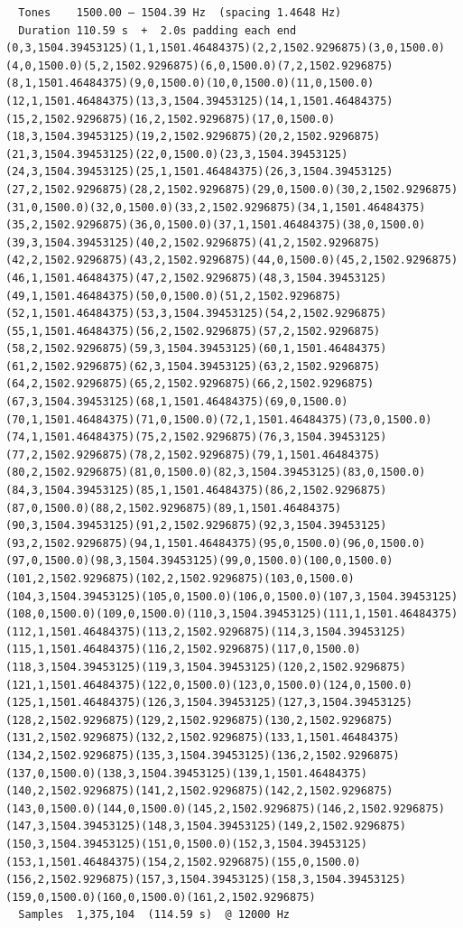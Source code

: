 \begin{lstlisting}
  Tones    1500.00 – 1504.39 Hz  (spacing 1.4648 Hz)
  Duration 110.59 s  +  2.0s padding each end
(0,3,1504.39453125)(1,1,1501.46484375)(2,2,1502.9296875)(3,0,1500.0)(4,0,1500.0)(5,2,1502.9296875)(6,0,1500.0)(7,2,1502.9296875)(8,1,1501.46484375)(9,0,1500.0)(10,0,1500.0)(11,0,1500.0)(12,1,1501.46484375)(13,3,1504.39453125)(14,1,1501.46484375)(15,2,1502.9296875)(16,2,1502.9296875)(17,0,1500.0)(18,3,1504.39453125)(19,2,1502.9296875)(20,2,1502.9296875)(21,3,1504.39453125)(22,0,1500.0)(23,3,1504.39453125)(24,3,1504.39453125)(25,1,1501.46484375)(26,3,1504.39453125)(27,2,1502.9296875)(28,2,1502.9296875)(29,0,1500.0)(30,2,1502.9296875)(31,0,1500.0)(32,0,1500.0)(33,2,1502.9296875)(34,1,1501.46484375)(35,2,1502.9296875)(36,0,1500.0)(37,1,1501.46484375)(38,0,1500.0)(39,3,1504.39453125)(40,2,1502.9296875)(41,2,1502.9296875)(42,2,1502.9296875)(43,2,1502.9296875)(44,0,1500.0)(45,2,1502.9296875)(46,1,1501.46484375)(47,2,1502.9296875)(48,3,1504.39453125)(49,1,1501.46484375)(50,0,1500.0)(51,2,1502.9296875)(52,1,1501.46484375)(53,3,1504.39453125)(54,2,1502.9296875)(55,1,1501.46484375)(56,2,1502.9296875)(57,2,1502.9296875)(58,2,1502.9296875)(59,3,1504.39453125)(60,1,1501.46484375)(61,2,1502.9296875)(62,3,1504.39453125)(63,2,1502.9296875)(64,2,1502.9296875)(65,2,1502.9296875)(66,2,1502.9296875)(67,3,1504.39453125)(68,1,1501.46484375)(69,0,1500.0)(70,1,1501.46484375)(71,0,1500.0)(72,1,1501.46484375)(73,0,1500.0)(74,1,1501.46484375)(75,2,1502.9296875)(76,3,1504.39453125)(77,2,1502.9296875)(78,2,1502.9296875)(79,1,1501.46484375)(80,2,1502.9296875)(81,0,1500.0)(82,3,1504.39453125)(83,0,1500.0)(84,3,1504.39453125)(85,1,1501.46484375)(86,2,1502.9296875)(87,0,1500.0)(88,2,1502.9296875)(89,1,1501.46484375)(90,3,1504.39453125)(91,2,1502.9296875)(92,3,1504.39453125)(93,2,1502.9296875)(94,1,1501.46484375)(95,0,1500.0)(96,0,1500.0)(97,0,1500.0)(98,3,1504.39453125)(99,0,1500.0)(100,0,1500.0)(101,2,1502.9296875)(102,2,1502.9296875)(103,0,1500.0)(104,3,1504.39453125)(105,0,1500.0)(106,0,1500.0)(107,3,1504.39453125)(108,0,1500.0)(109,0,1500.0)(110,3,1504.39453125)(111,1,1501.46484375)(112,1,1501.46484375)(113,2,1502.9296875)(114,3,1504.39453125)(115,1,1501.46484375)(116,2,1502.9296875)(117,0,1500.0)(118,3,1504.39453125)(119,3,1504.39453125)(120,2,1502.9296875)(121,1,1501.46484375)(122,0,1500.0)(123,0,1500.0)(124,0,1500.0)(125,1,1501.46484375)(126,3,1504.39453125)(127,3,1504.39453125)(128,2,1502.9296875)(129,2,1502.9296875)(130,2,1502.9296875)(131,2,1502.9296875)(132,2,1502.9296875)(133,1,1501.46484375)(134,2,1502.9296875)(135,3,1504.39453125)(136,2,1502.9296875)(137,0,1500.0)(138,3,1504.39453125)(139,1,1501.46484375)(140,2,1502.9296875)(141,2,1502.9296875)(142,2,1502.9296875)(143,0,1500.0)(144,0,1500.0)(145,2,1502.9296875)(146,2,1502.9296875)(147,3,1504.39453125)(148,3,1504.39453125)(149,2,1502.9296875)(150,3,1504.39453125)(151,0,1500.0)(152,3,1504.39453125)(153,1,1501.46484375)(154,2,1502.9296875)(155,0,1500.0)(156,2,1502.9296875)(157,3,1504.39453125)(158,3,1504.39453125)(159,0,1500.0)(160,0,1500.0)(161,2,1502.9296875)
  Samples  1,375,104  (114.59 s)  @ 12000 Hz
\end{lstlisting}

